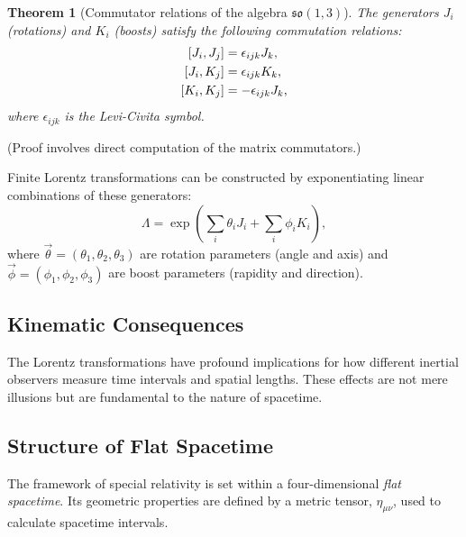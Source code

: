 \documentclass{amsart}
\newtheorem{theorem}{Theorem}[section]
\theoremstyle{definition}
\theoremstyle{remark}
\begin{document}
\begin{theorem}[Commutator relations of the algebra $\mathfrak{so}(1,3)$]\label{thm:so13_algebra_commutation_relations}
  The generators $J_i$ (rotations) and $K_i$ (boosts) satisfy the following commutation relations:
  \begin{align*}
    \relax [J_i, J_j] &= \epsilon_{ijk} J_k, \\
    \relax [J_i, K_j] &= \epsilon_{ijk} K_k, \\
    \relax [K_i, K_j] &= -\epsilon_{ijk} J_k,
  \end{align*}
  where $\epsilon_{ijk}$ is the Levi-Civita symbol.
\end{theorem}
(Proof involves direct computation of the matrix commutators.)

Finite Lorentz transformations can be constructed by exponentiating linear combinations of these generators:
\begin{equation*}
  \Lambda = \exp\left(\sum_i \theta_i J_i + \sum_i \phi_i K_i \right),
\end{equation*}
where $\vec{\theta} = (\theta_1, \theta_2, \theta_3)$ are rotation parameters (angle and axis) and $\vec{\phi} = (\phi_1, \phi_2, \phi_3)$ are boost parameters (rapidity and direction).

\subsection{Kinematic Consequences}
\label{subsec:sr_kinematics}
The Lorentz transformations have profound implications for how different inertial observers measure time intervals and spatial lengths. These effects are not mere illusions but are fundamental to the nature of spacetime.

\subsection{Structure of Flat Spacetime}
\label{subsec:sr_structure}
The framework of special relativity is set within a four-dimensional \emph{flat spacetime}. Its geometric properties are defined by a metric tensor, $\eta_{\mu\nu}$, used to calculate spacetime intervals.
\end{document}
